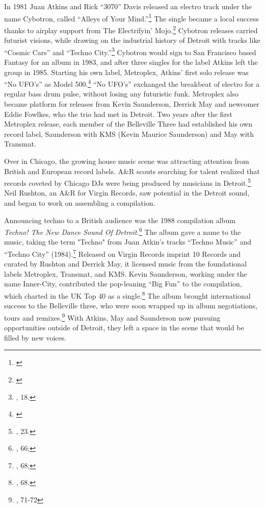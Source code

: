 \documentclass[12pt,twoside]{reedthesis}
\begin{document}
In 1981 Juan Atkins and Rick ``3070'' Davis released an electro track under the name Cybotron, called ``Alleys of Your Mind.''\footnote{\cite{cybotronAlleysYourMind1981}} The single became a local success thanks to airplay support from The Electrifyin' Mojo.\footnote{\cite{zlatopolskyTheaterMindLegacy2015}} Cybotron releases carried futurist visions, while drawing on the industrial history of Detroit with tracks like ``Cosmic Cars'' and ``Techno City.''\footnote{\cite{reynoldsGenerationEcstasyWorld1998}, 18.} Cybotron would sign to San Francisco based Fantasy for an album in 1983, and after three singles for the label Atkins left the group in 1985. Starting his own label, Metroplex, Atkins' first solo release was ``No UFO's'' as Model 500.\footnote{\cite{model500NoUFO1985}} ``No UFO's'' exchanged the breakbeat of electro for a regular bass drum pulse, without losing any futuristic funk. Metroplex also became platform for releases from Kevin Saunderson, Derrick May and newcomer Eddie Fowlkes, who the trio had met in Detroit. Two years after the first Metroplex release, each member of the Belleville Three had established his own record label, Saunderson with KMS (Kevin Maurice Saunderson) and May with Transmat. 

Over in Chicago, the growing house music scene was attracting attention from British and European record labels. A{\&}R scouts searching for talent realized that records coveted by Chicago DJs were being produced by musicians in Detroit.\footnote{\cite{reynoldsGenerationEcstasyWorld1998}, 23.} Neil Rushton, an A{\&}R for Virgin Records, saw potential in the Detroit sound, and began to work on assembling a compilation.

Announcing techno to a British audience was the 1988 compilation album \emph{Techno! The New Dance Sound Of Detroit.}\footnote{\cite{sickoTechnoRebelsRenegades2010}, 66;\cite{variousartistsTechnoNewDance1988}} The album gave a name to the music, taking the term "Techno" from Juan Atkin's tracks ``Techno Music'' and ``Techno City'' (1984).\footnote{\cite{sickoTechnoRebelsRenegades2010}, 68;\cite{cybotronTechnoCity1984}} Released on Virgin Records imprint 10 Records and curated by Rushton and Derrick May, it licensed music from the foundational labels Metroplex, Transmat, and KMS. Kevin Saunderson, working under the name Inner-City, contributed the pop-leaning ``Big Fun'' to the compilation, which charted in the UK Top 40 as a single.\footnote{\cite{sickoTechnoRebelsRenegades2010}, 68.} The album brought international success to the Belleville three,  who were soon wrapped up in album negotiations, tours and remixes.\footnote{\cite{sickoTechnoRebelsRenegades2010}, 71-72} With Atkins, May and Saunderson now pursuing opportunities outside of Detroit, they left a space in the scene that would be filled by new voices.
\end{document}
